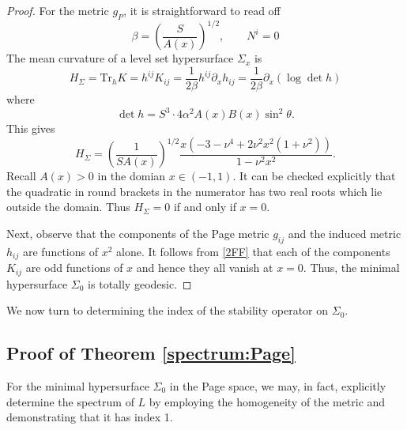 \documentclass[11pt]{amsart}
\theoremstyle{plain}
\theoremstyle{definition}
\numberwithin{equation}{section}
\begin{document}
\begin{proof} For the metric $g_P$, it is straightforward to read off 
\begin{equation}
    \beta = \left(\frac{S}{A(x)}\right)^{1/2}, \qquad N^i =0
\end{equation} The mean curvature of a level set hypersurface $\Sigma_x$ is 
\begin{equation}
    H_\Sigma = \text{Tr}_h K =  h^{ij} K_{ij} = \frac{1}{2\beta} h^{ij}\partial_x h_{ij} = \frac{1}{2\beta} \partial_x (\log \det h)
\end{equation} where
\begin{equation}
    \det h = S^3 \cdot 4 \alpha^2 A(x) B(x) \sin^2\theta.
\end{equation} This gives
\begin{equation}\label{HPage}
    H_\Sigma = \left(\frac{1}{S A(x)}\right)^{1/2} \frac{x (-3 - \nu^4  + 2\nu^2 x^2(1+\nu^2))}{1 - \nu^2 x^2}.
\end{equation} Recall $A(x) > 0$ in the domian $x \in (-1,1)$. It can be checked explicitly that the quadratic in round brackets in the numerator has two real roots which lie outside the domain. Thus $H_\Sigma = 0$ if and only if $x =0$. 

Next, observe that the components of the Page metric $g_{ij}$ and the induced metric $h_{ij}$ are functions of $x^2$ alone. It follows from \eqref{2FF} that each of the components $K_{ij}$ are odd functions of $x$ and hence they all vanish at $x=0$. Thus, the minimal hypersurface $\Sigma_0$ is totally geodesic. 
\end{proof}
We now turn to determining the index of the stability operator on $\Sigma_0$. 

\subsection{Proof of Theorem \ref{spectrum:Page}}
For the minimal hypersurface $\Sigma_0$ in the Page space, we may, in fact, explicitly determine the spectrum of $L$ by employing the homogeneity of the metric and demonstrating that it has index 1. 
\end{document}
